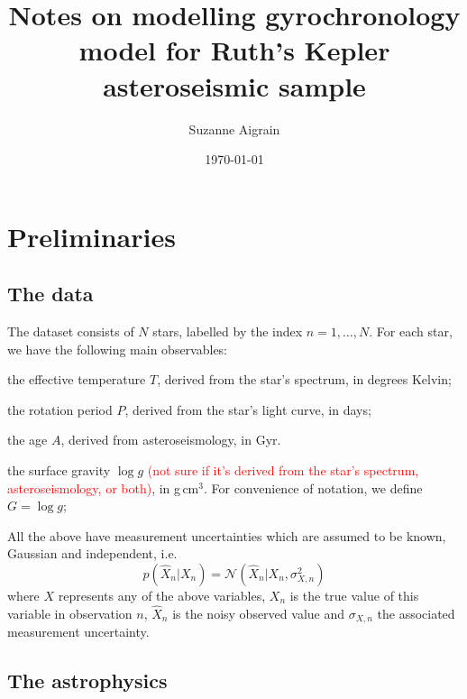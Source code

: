 \documentclass[11pt,a4paper]{article}
\newenvironment{packed_item}{
\begin{itemize}
\setlength{\itemsep}{1pt}
\setlength{\parskip}{0pt}
\setlength{\parsep}{0pt}
}{\end{itemize}}
\newcommand{\red}[1]{\textcolor{red}{#1}}
\begin{document}
\title{Notes on modelling gyrochronology model for Ruth's Kepler asteroseismic sample}
\author{Suzanne Aigrain}
\date{\today}

\maketitle

\section{Preliminaries}

\subsection{The data}

The dataset consists of $N$ stars, labelled by the index $n =
1,\ldots,N$. For each star, we have the following main observables:
\begin{packed_item}
\item the effective temperature $T$, derived from the star's spectrum,
  in degrees Kelvin;
\item the rotation period $P$, derived from the star's light curve, in
  days;
\item the age $A$, derived from asteroseismology, in Gyr.
\item the surface gravity $\log g$ \red{(not sure if it's derived from
    the star's spectrum, asteroseismology, or both)}, in
  g\,cm$^{3}$. For convenience of notation, we define $G=\log g$;
\end{packed_item}
All the above have measurement uncertainties which are assumed to be
known, Gaussian and independent, i.e.
\begin{equation}
p(\hat{X}_n|X_n) = \mathcal{N}(\hat{X}_n|X_n,\sigma_{X,n}^2)
\end{equation}
where $X$ represents any of the above variables, $X_n$ is the true
value of this variable in observation $n$, $\hat{X}_n$ is the noisy
observed value and $\sigma_{X,n}$ the associated measurement
uncertainty.

\subsection{The astrophysics}
\label{sec:astro}
\end{document}
